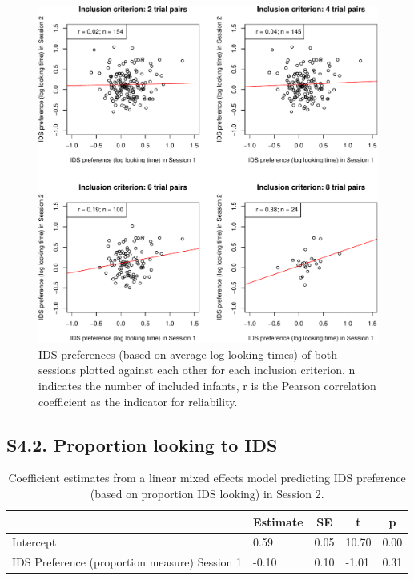 \documentclass[
  man, donotrepeattitle,floatsintext]{apa6}
\begin{document}
\begin{figure}

{\centering \includegraphics[width=5in]{MB1T_supplement_files/figure-latex/unnamed-chunk-8-1} 

}

\caption{IDS preferences (based on average log-looking times) of both sessions plotted against each other for each inclusion criterion. n indicates the number of included infants, r is the Pearson correlation coefficient as the indicator for reliability.}\label{fig:unnamed-chunk-8}
\end{figure}

\hypertarget{s4.2.-proportion-looking-to-ids}{%
\subsection{S4.2. Proportion looking to IDS}\label{s4.2.-proportion-looking-to-ids}}

\begin{table}[tbp]

\begin{center}
\begin{threeparttable}

\caption{\label{tab:unnamed-chunk-9}Coefficient estimates from a linear mixed effects model predicting IDS preference (based on proportion IDS looking) in Session 2.}

\begin{tabular}{lllll}
\toprule
 & \multicolumn{1}{c}{Estimate} & \multicolumn{1}{c}{SE} & \multicolumn{1}{c}{t} & \multicolumn{1}{c}{p}\\
\midrule
Intercept & 0.59 & 0.05 & 10.70 & 0.00\\
IDS Preference (proportion measure) Session 1 & -0.10 & 0.10 & -1.01 & 0.31\\
\bottomrule
\end{tabular}

\end{threeparttable}
\end{center}

\end{table}
\end{document}
